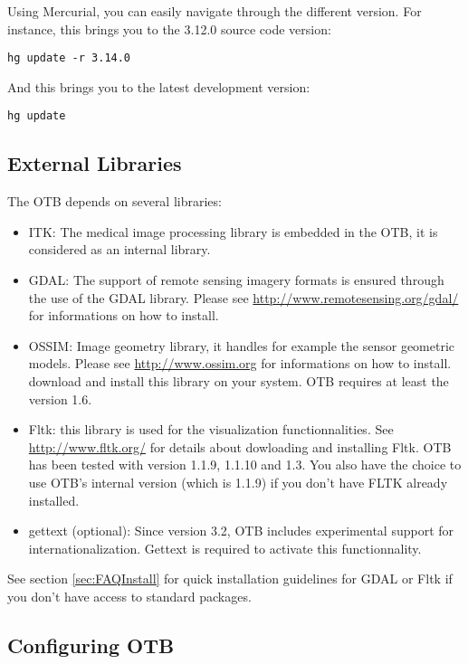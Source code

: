 Using Mercurial, you can easily navigate through the different version. For instance, this brings you to the 3.12.0 source code version:
\begin{verbatim}
hg update -r 3.14.0
\end{verbatim}

And this brings you to the latest development version:
\begin{verbatim}
hg update
\end{verbatim}


\subsection{External Libraries}

The OTB depends on several libraries:
\begin{itemize}
\item ITK: The medical image processing library is embedded in the OTB, it is considered as an internal library.
\item GDAL: The support of remote sensing imagery formats is ensured
  through the use of the GDAL library. Please see
  \url{http://www.remotesensing.org/gdal/} for informations on how to install.
\item OSSIM: Image geometry library, it handles for example the sensor geometric models. 
  Please see \url{http://www.ossim.org} for informations on how to install.
download and install this library on your system. OTB requires at least the version 1.6.
\item Fltk: this library is used for the visualization
  functionnalities. See \url{http://www.fltk.org/} for details about
  dowloading and installing Fltk. OTB has been tested with version 1.1.9,
  1.1.10 and 1.3. You also have the choice to use OTB's internal
  version (which is 1.1.9) if you don't have FLTK already installed.
\item gettext (optional): Since version 3.2, OTB includes experimental support 
  for internationalization. Gettext is required to activate this 
  functionnality.  
\end{itemize}

See section \ref{sec:FAQInstall} for quick installation guidelines for GDAL or Fltk if you don't have access 
to standard packages.

\subsection{Configuring OTB}
\label{sec:ConfiguringOTB}

